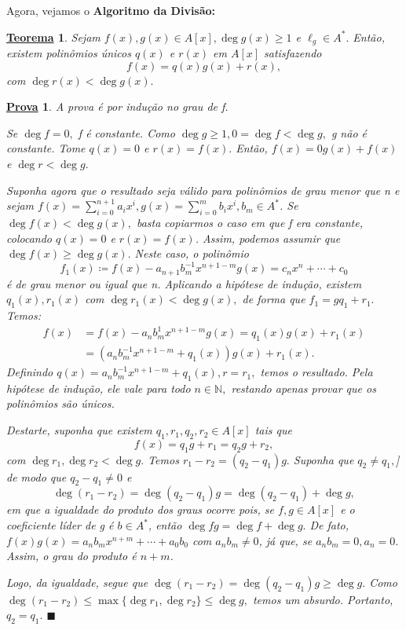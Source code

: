 \documentclass{article}
\newtheorem*{theorem*}{\underline{Teorema}}
\newtheorem*{proof*}{\underline{Prova}}
\renewcommand\qedsymbol{$\blacksquare$}
\begin{document}
  Agora, vejamos o \textbf{Algoritmo da Divisão:}
 \begin{theorem*}
  Sejam \(f(x), g(x)\in A[x], \deg{g(x)}\geq 1\) e \(\ell_{g}\in A^{*}.\) Então,
  existem polinômios únicos \(q(x)\) e \(r(x)\) em \(A[x]\) satisfazendo 
  \[
    f(x) = q(x)g(x) + r(x),
  \]
com \(\deg{r(x)} < \deg{g(x)}.\)
 \end{theorem*}
 \begin{proof*}
  A prova é por indução no grau de f.

  Se \(\deg{f}=0,\) f é constante. Como \(\deg{g}\geq 1, 0 = \deg{f} < \deg{g},\) g não é constante.
  Tome \(q(x) = 0\) e \(r(x) = f(x).\) Então, \(f(x) = 0g(x) + f(x)\) e \(\deg{r} < \deg{g}.\)

  Suponha agora que o resultado seja válido para polinômios de grau menor que n e sejam \(f(x) = \sum\limits_{i=0}^{n+1}a_{i}x^{i}, g(x) = \sum\limits_{i=0}^{m}b_{i}x^{i}, b_{m}\in A^{*}\).
Se \(\deg{f(x)} < \deg{g(x)},\) basta copiarmos o caso em que f era constante, colocando \(q(x) = 0\) e \(r(x) = f(x)\).
Assim, podemos assumir que \(\deg{f(x)}\geq \deg{g(x)}.\) Neste caso, o polinômio 
  \[
    f_{1}(x)\coloneqq f(x) - a_{n+1}b_{m}^{-1}x^{n+1-m}g(x) = c_{n}x^{n} + \cdots + c_{0}
  \] 
  é de grau menor ou igual que n. Aplicando a hipótese de indução, existem \(q_{1}(x), r_{1}(x)\) 
com \(\deg{r_{1}(x)} < \deg{g(x)},\) de forma que \(f_{1} = gq_{1} + r_{1}.\) Temos:
\begin{align*}
  f(x) &= f(x)-a_{n}b_{m}^{1}x^{n+1-m}g(x) = q_{1}(x)g(x) + r_{1}(x)\\
       &= (a_{n}b_{m}^{-1}x^{n+1-m}+q_{1}(x))g(x) + r_{1}(x).
\end{align*}
  Definindo \(q(x) = a_{n}b_{m}^{-1}x^{n+1-m}+q_{1}(x), r = r_{1},\) temos o resultado. Pela hipótese
de indução, ele vale para todo \(n\in \mathbb{N},\) restando apenas provar que os polinômios são únicos.

Destarte, suponha que existem \(q_{1}, r_{1}, q_{2}, r_{2}\in A[x]\) tais que 
  \[
    f(x) = q_{1}g+r_{1} = q_{2}g+r_{2},
  \]
com \(\deg{r_{1}}, \deg{r_{2}} < \deg{g}.\) Temos \(r_{1}-r_{2} = (q_{2}-q_{1})g.\) Suponha que \(q_{2}\neq q_{1},\)]
de modo que \(q_{2}-q_{1}\neq0\) e 
  \[
    \deg{(r_{1}-r_{2})} = \deg{(q_{2}-q_{1})}g = \deg{(q_{2}-q_{1})} + \deg{g},
  \]
em que a igualdade do produto dos graus ocorre pois, se \(f, g\in A[x]\) e o coeficiente líder de g é \(b\in A^{*}\),
então \(\deg{fg} = \deg{f} + \deg{g}.\) De fato, \(f(x)g(x) = a_{n}b_{m}x^{n+m} + \cdots + a_{0}b_{0}\) com
 \(a_{n}b_{m}\neq0\), já que, se \(a_{n}b_{m} = 0, a_{n} = 0.\) Assim, o grau do produto é \(n+m\).

  Logo, da igualdade, segue que \(\deg{(r_{1}-r_{2})} = \deg{(q_{2}-q_{1})g}\geq \deg{g}.\) Como
 \(\deg{(r_{1}-r_{2})}\leq \max\{\deg{r_{1}}, \deg{r_{2}}\}\leq \deg{g},\) temos um absurdo. Portanto,
  \(q_{2} = q_{1}.\) \qedsymbol
 \end{proof*}
\end{document}
